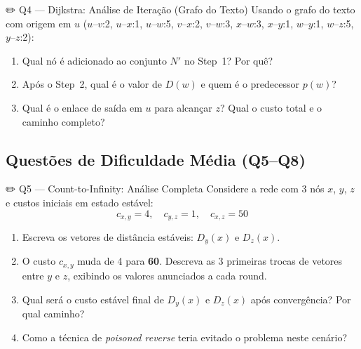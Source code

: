 \documentclass[11pt,a4paper]{article}
\begin{document}
\begin{questao}{✏️ Q4 --- Dijkstra: Análise de Iteração (Grafo do Texto)}
Usando o grafo do texto com origem em \textbf{$u$} ($u$--$v$:2, $u$--$x$:1, $u$--$w$:5, $v$--$x$:2, $v$--$w$:3, $x$--$w$:3, $x$--$y$:1, $w$--$y$:1, $w$--$z$:5, $y$--$z$:2):
\begin{enumerate}[label=(\alph*)]
    \item Qual nó é adicionado ao conjunto $N'$ no Step~1? Por quê?
    \item Após o Step~2, qual é o valor de $D(w)$ e quem é o predecessor $p(w)$?
    \item Qual é o enlace de saída em $u$ para alcançar $z$? Qual o custo total e o caminho completo?
\end{enumerate}
\end{questao}

\subsection*{Questões de Dificuldade Média (Q5--Q8)}

\begin{questao}{✏️ Q5 --- Count-to-Infinity: Análise Completa}
Considere a rede com 3 nós $x$, $y$, $z$ e custos iniciais em estado estável:
\[
c_{x,y} = 4, \quad c_{y,z} = 1, \quad c_{x,z} = 50
\]
\begin{enumerate}[label=(\alph*)]
    \item Escreva os vetores de distância estáveis: $D_y(x)$ e $D_z(x)$.
    \item O custo $c_{x,y}$ muda de 4 para \textbf{60}. Descreva as 3 primeiras trocas de vetores entre $y$ e $z$, exibindo os valores anunciados a cada round.
    \item Qual será o custo estável final de $D_y(x)$ e $D_z(x)$ após convergência? Por qual caminho?
    \item Como a técnica de \textit{poisoned reverse} teria evitado o problema neste cenário?
\end{enumerate}
\end{questao}
\end{document}
